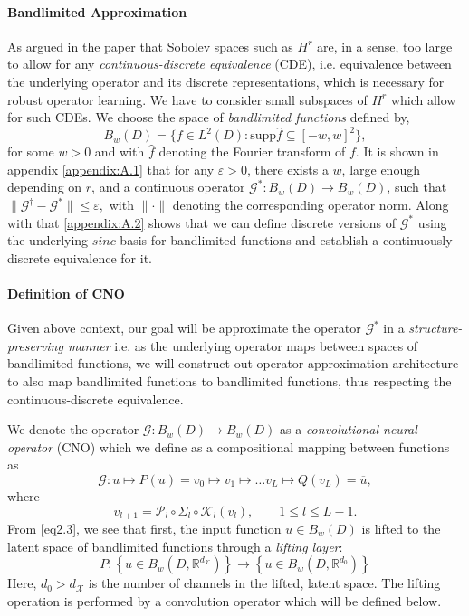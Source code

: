 \documentclass[reqno,10pt]{amsart}
\theoremstyle{plain}
\theoremstyle{definition}
\newcommand{\bb}[1]{\mathbb{#1}}
\newcommand{\cal}[1]{\mathcal{#1}}
\begin{document}
    \paragraph{\bf Bandlimited Approximation} As argued in the paper \cite{FB2023} that Sobolev spaces such as $H^r$ are, in a sense, too large to allow for any {\it continuous-discrete equivalence} (CDE), i.e. equivalence between the underlying operator and its discrete representations, which is necessary for robust operator learning. We have to consider small subspaces of $H^r$ which allow for such CDEs. We choose the space of {\it bandlimited functions} defined by,
    \begin{equation}
        B_w(D) = \{f \in L^2(D) : \text{supp}\hat{f} \subseteq [-w,w]^2\},
    \end{equation}
    for some $w > 0$ and with $\hat{f}$ denoting the Fourier transform of $f$. It is shown in appendix \ref{appendix:A.1} that for any $\varepsilon > 0$, there exists a $w$, large enough depending on $r$, and a continuous operator $\cal G^* : B_w(D) \to B_w(D)$, such that $\|\cal G^\dag - \cal G^*\| \leq \varepsilon,$ with $\|\cdot\|$ denoting the corresponding operator norm. Along with that \ref{appendix:A.2} shows that we can define discrete versions of $\cal G^*$ using the underlying $sinc$ basis for bandlimited functions and establish a continuously-discrete equivalence for it.

    \paragraph{\bf Definition of CNO} Given above context, our goal will be approximate the operator $\cal G^*$ in a {\it structure-preserving manner} i.e. as the underlying operator maps between spaces of bandlimited functions, we will construct out operator approximation architecture to also map bandlimited functions to bandlimited functions, thus respecting the continuous-discrete equivalence.

    \noindent We denote the operator $\cal G : B_w(D) \to B_w(D)$ as a {\it convolutional neural operator} (CNO) which we define as a compositional mapping between functions as
    \begin{equation}\label{eq2.3}
        \cal G : u \mapsto P(u) = v_0 \mapsto v_1 \mapsto \dots v_L \mapsto Q(v_L) = \overline{u},
    \end{equation}
    where
    \begin{equation}
        v_{l+1} = \cal P_l \circ \Sigma_l \circ \cal K_l(v_l), \qquad 1 \leq l \leq L - 1.
    \end{equation}
    From \ref{eq2.3}, we see that first, the input function $u \in B_w(D)$ is lifted to the latent space of bandlimited functions through a {\it lifting layer}: 
    $$ P : \left\{u \in B_w(D,\bb R^{d_{\cal X}}) \right\} \to \left\{u \in B_w(D,\bb R^{d_0}) \right\}$$ 
    Here, $d_0 > d_{\cal X}$ is the number of channels in the lifted, latent space. The lifting operation is performed by a convolution operator which will be defined below.
\end{document}
